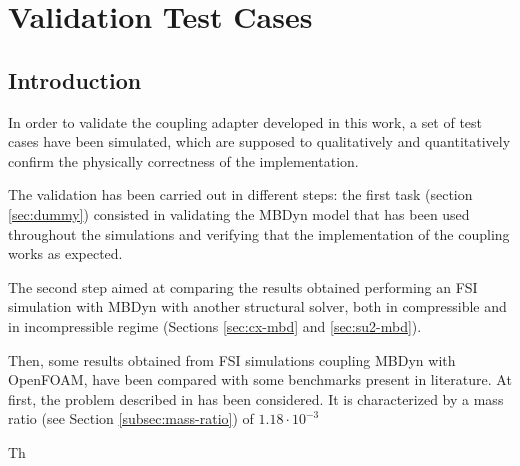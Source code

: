 \chapter{Validation Test Cases}
\label{cha:tests}


\section{Introduction}

In order to validate the coupling adapter developed in this work, a set of test cases have been simulated, which are supposed to qualitatively and quantitatively confirm the physically correctness of the implementation.

The validation has been carried out in different steps: the first task (section \ref{sec:dummy}) consisted in validating the MBDyn model that has been used throughout the simulations and verifying that the implementation of the coupling works as expected.

The second step aimed at comparing the results obtained performing an FSI simulation with MBDyn with another structural solver, both in compressible and in incompressible regime (Sections \ref{sec:cx-mbd} and \ref{sec:su2-mbd}).

Then, some results obtained from FSI simulations coupling MBDyn with OpenFOAM, have been compared with some benchmarks present in literature. At first, the problem described in \cite{ramm1998fluid} has been considered. It is characterized by a mass ratio (see Section \ref{subsec:mass-ratio}) of $1.18\cdot 10^{-3}$  

Th

